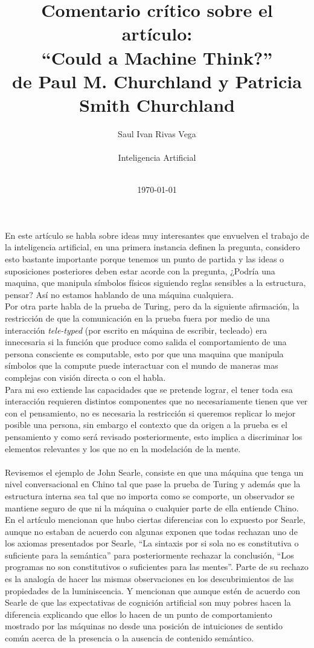 \documentclass[12pt]{article}
\title{Comentario crítico sobre el artículo:\\ “Could a Machine Think?” \\ de Paul M. Churchland y Patricia Smith Churchland}
\author{
	Saul Ivan Rivas Vega \\
	\\
	Inteligencia Artificial\\
\\
}
\date{\today}
\begin{document}
	\maketitle
	\pagebreak
	\paragraph{}
	En este artículo se habla sobre ideas muy interesantes que envuelven el trabajo de la inteligencia artificial, en una primera instancia definen la pregunta, considero esto bastante importante porque tenemos un punto de partida y las ideas o suposiciones posteriores deben estar acorde con la pregunta, ¿Podría una maquina, que manipula símbolos físicos siguiendo reglas sensibles a la estructura, pensar? Así no estamos hablando de una máquina cualquiera.\\
	Por otra parte habla de la prueba de Turing, pero da la siguiente afirmación, la restricción de que la comunicación en la prueba fuera por medio de una interacción \textit{tele-typed} (por escrito en máquina de escribir, tecleado) era innecesaria si la función que produce como salida el comportamiento de una persona consciente es computable, esto por que una maquina que manipula símbolos que la compute puede interactuar con el mundo de maneras mas complejas con visión directa o con el habla.\\
	Para mi eso extiende las capacidades que se pretende lograr, el tener toda esa interacción requieren distintos componentes que no necesariamente tienen que ver con el pensamiento, no es necesaria la restricción si queremos replicar lo mejor posible una persona, sin embargo el contexto que da origen a la prueba es el pensamiento y como será revisado posteriormente, esto implica a discriminar los elementos relevantes y los que no en la modelación de la mente.\\
	\\
	Revisemos el ejemplo de John Searle, consiste en que una máquina que tenga un nivel conversacional en Chino tal que pase la prueba de Turing y además que la estructura interna sea tal que no importa como se comporte, un observador se mantiene seguro de que ni la máquina o cualquier parte de ella entiende Chino. En el artículo mencionan que hubo ciertas diferencias con lo expuesto por Searle, aunque no estaban de acuerdo con algunas exponen que todas rechazan uno de los axiomas presentados por Searle, “La sintaxis por si sola no es constitutiva o suficiente para la semántica” para posteriormente rechazar la conclusión, “Los programas no son constitutivos o suficientes para las mentes”. Parte de su rechazo es la analogía de hacer las mismas observaciones en los descubrimientos de las propiedades de la luminiscencia. Y mencionan que aunque estén de acuerdo con Searle de que las expectativas de cognición artificial son muy pobres hacen la diferencia explicando que ellos lo hacen de un punto de comportamiento mostrado por las máquinas no desde una posición de intuiciones de sentido común acerca de la presencia o la ausencia de contenido semántico.
\end{document}
